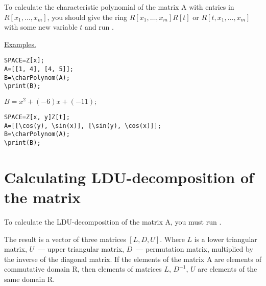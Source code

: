 To calculate the characteristic polynomial of the matrix A with entries in $R[x_1,\ldots,x_m]$, you should give the ring $R[x_1,\ldots,x_m]R[t]$ or $R[t,x_1,\ldots,x_m]$ with some new variable  $t$
and run  . 

\underline{Examples. }

\vspace*{-2mm}
\begin{verbatim}
SPACE=Z[x]; 
A=[[1, 4], [4, 5]];
B=\charPolynom(A); 
\print(B);
\end{verbatim}

{$B = x^{2}+(-6)x+(-11);$} 

\begin{verbatim}
SPACE=Z[x, y]Z[t]; 
A=[[\cos(y), \sin(x)], [\sin(y), \cos(x)]];
B=\charPolynom(A); 
\print(B);
\end{verbatim}


\section{Calculating LDU-decomposition of the matrix} 
To calculate the LDU-decomposition of the matrix A, you must run 
 . 

 The result is a vector of three matrices $[L,D,U]$. Where $L$ is a lower triangular matrix, $U$~--- upper triangular matrix, 
$D$~--- permutation matrix, multiplied by the inverse of the diagonal matrix. If the elements of the matrix A are elements of commutative domain R, then 
elements of  matrices $L$, $D^{-1}$, $U$ are elements of the same domain R.

